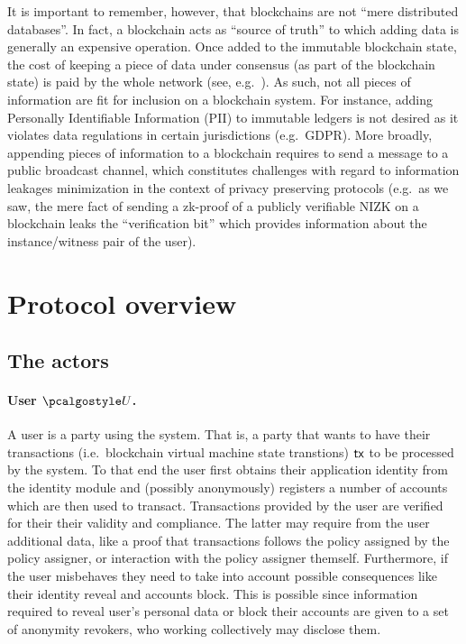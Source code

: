 \documentclass[runningheads,10pt]{llncs}
\numberwithin{equation}{section}
\begin{document}
It is important to remember, however, that blockchains are not ``mere
distributed databases''. In fact, a blockchain acts as ``source of truth'' to
which adding data is generally an expensive operation. Once added to the
immutable blockchain state, the cost of keeping a piece of data under consensus
(as part of the blockchain state) is paid by the whole network (see,
e.g.~\cite{zeth-state-simulation2021}). As such, not all pieces of information
are fit for inclusion on a blockchain system. For instance, adding Personally
Identifiable Information (PII) to immutable ledgers is not desired as it
violates data regulations in certain jurisdictions (e.g.~GDPR). More broadly,
appending pieces of information to a blockchain requires to send a message to a
public broadcast channel, which constitutes challenges with regard to
information leakages minimization in the context of privacy preserving
protocols (e.g.~as we saw, the mere fact of sending a zk-proof of a publicly
verifiable NIZK on a blockchain leaks the ``verification bit'' which provides
information about the instance/witness pair of the user).

\section{Protocol overview}

\subsection{The actors}
\paragraph{User $\user$.}
A user is a party using the system. That is, a party that wants to have their
transactions (i.e.~blockchain virtual machine state transtions) $\mathsf{tx}$ to be
processed by the system. To that end the user first obtains their application
identity from the identity module and (possibly anonymously) registers a number
of accounts which are then used to transact. Transactions provided by the user
are verified for their their validity and compliance. The latter may require
from the user additional data, like a proof that transactions follows the policy
assigned by the policy assigner, or interaction with the policy assigner
themself. Furthermore, if the user misbehaves they need to take into account
possible consequences like their identity reveal and accounts block. This is
possible since information required to reveal user's personal data or block
their accounts are given to a set of anonymity revokers, who working
collectively may disclose them.
\end{document}
